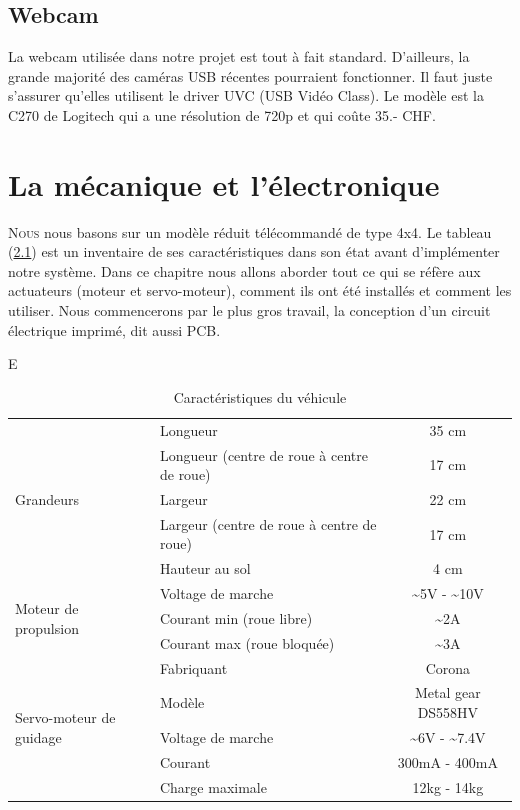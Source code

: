 \documentclass[a4paper,11pt]{report}
\begin{document}
{\section{Webcam}

La webcam utilisée dans notre projet est tout à fait standard. D'ailleurs, la grande majorité des caméras USB récentes pourraient fonctionner. Il faut juste s'assurer qu'elles utilisent le driver UVC (USB Vidéo Class)\cite{uvc}. Le modèle est la C270 de Logitech qui a une résolution de 720p et qui coûte 35.- CHF.

\chapter{La mécanique et l'électronique}


\lettrine{N}{ous} nous basons sur un modèle réduit
télécommandé de type 4x4. Le tableau (\ref{caracteristiquesDuVehicule}) est un
inventaire de ses caractéristiques dans son état avant d'implémenter notre système. Dans ce chapitre nous
allons aborder tout ce qui se réfère aux actuateurs (moteur et servo-moteur),
comment ils ont été installés et comment les utiliser. Nous commencerons par
le plus gros travail, la conception d'un circuit électrique imprimé, dit aussi PCB. 

E
\begin{table}[h!]
\begin{center}
  \begin{tabular}{|p{4cm}|p{4cm}|c|}
    \hline
    \multirow{5}{*}{Grandeurs}
    &Longueur & 35 cm \\ \cline{2-3}
    &Longueur (centre de roue \`a centre de roue)& 17 cm \\ \cline{2-3}
    &Largeur & 22 cm \\ \cline{2-3}
    &Largeur (centre de roue \`a centre de roue) & 17 cm \\ \cline{2-3}
    & Hauteur au sol & 4 cm\\ \hline
    \multirow{3}{*}{Moteur de propulsion}
    & Voltage de marche & \~{}5V - \~{}10V  \\ \cline{2-3}
    & Courant min (roue libre) & \~{}2A \\ \cline{2-3}
    & Courant max (roue bloqu\'ee) & \~{}3A \\ \hline
    \multirow{5}{*}{Servo-moteur de guidage}
    & Fabriquant & Corona \\ \cline{2 - 3}
    & Modèle & Metal gear DS558HV\\ \cline{2-3}
    & Voltage de marche & \~{}6V - \~{}7.4V  \\ \cline{2-3}
    & Courant & 300mA - 400mA \\ \cline{2-3}
    & Charge maximale & 12kg - 14kg \\  
 \hline
	\end{tabular}
\end{center}
\caption{Caractéristiques du véhicule\label{caracteristiquesDuVehicule}}
\end{table}

}
\end{document}
